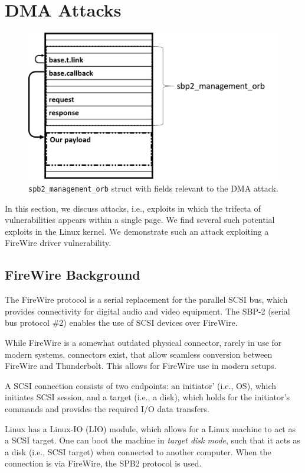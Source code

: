 \section{\Simple{} DMA Attacks}\label{sec:attack_setup}
\begin{figure}
    \centering
    \includegraphics[width=1\linewidth]{figs/sbp.png}
    \caption{\texttt{spb2\_management\_orb} struct with fields relevant to the DMA attack.}
    \label{fig:orb}
\end{figure}
In this section, we discuss \simple{} attacks, i.e., exploits in which the trifecta of vulnerabilities appears within a single page.
We find several such potential \simple{} exploits in the Linux kernel. We demonstrate such an attack exploiting a FireWire driver vulnerability. 

\subsection{FireWire Background}

The FireWire protocol is a serial replacement for the parallel SCSI bus, which provides connectivity for digital audio and video equipment. The SBP-2 (serial bus protocol $\#2$) enables the use of SCSI devices over FireWire. 

While FireWire is a somewhat outdated physical connector, rarely in use for modern systems, connectors exist, that allow seamless conversion between FireWire and Thunderbolt. This allows for FireWire use in modern setups.

A SCSI connection consists of two endpoints: an initiator' (i.e., OS), which initiates SCSI session, and a target (i.e., a disk), which holds for the initiator's commands and provides the required I/O data transfers. 

Linux has a Linux-IO (LIO) module, which allows for a Linux machine to act as a SCSI target. One can boot the machine in \emph{target disk mode}, such that it acts as a disk (i.e., SCSI target) when connected to another computer. When the connection is via FireWire, the SPB2 protocol is used.

